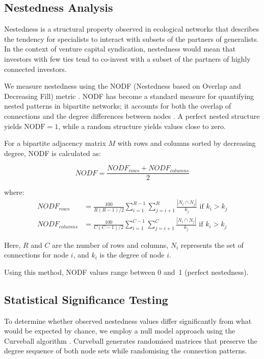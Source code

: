\subsection{Nestedness Analysis}

Nestedness is a structural property observed in ecological networks \cite{Bascompte2003,AlmeidaNeto2008} that describes the tendency for specialists to interact with subsets of the partners of generalists. In the context of venture capital syndication, nestedness would mean that investors with few ties tend to co-invest with a subset of the partners of highly connected investors.

We measure nestedness using the NODF (Nestedness based on Overlap and Decreasing Fill) metric \cite{AlmeidaNeto2008}. NODF has become a standard measure for quantifying nested patterns in bipartite networks; it accounts for both the overlap of connections and the degree differences between nodes \cite{Dormann2009}. A perfect nested structure yields $\mathrm{NODF}=1$, while a random structure yields values close to zero.

For a bipartite adjacency matrix $M$ with rows and columns sorted by decreasing degree, NODF is calculated as:

\begin{equation}
NODF = \frac{NODF_{rows} + NODF_{columns}}{2}
\end{equation}

where:
\begin{align}
NODF_{rows} &= \frac{100}{R(R-1)/2} \sum_{i=1}^{R-1} \sum_{j=i+1}^{R} \frac{|N_i \cap N_j|}{k_j} \text{ if } k_i > k_j \\
NODF_{columns} &= \frac{100}{C(C-1)/2} \sum_{i=1}^{C-1} \sum_{j=i+1}^{C} \frac{|N_i \cap N_j|}{k_j} \text{ if } k_i > k_j
\end{align}

Here, $R$ and $C$ are the number of rows and columns, $N_i$ represents the set of connections for node $i$, and $k_i$ is the degree of node $i$.

Using this method, NODF values range between 0 and~1 (perfect nestedness).

\subsection{Statistical Significance Testing}

To determine whether observed nestedness values differ significantly from what would be expected by chance, we employ a null model approach using the Curveball algorithm \cite{Strona2014}. Curveball generates randomised matrices that preserve the degree sequence of both node sets while randomising the connection patterns.  

